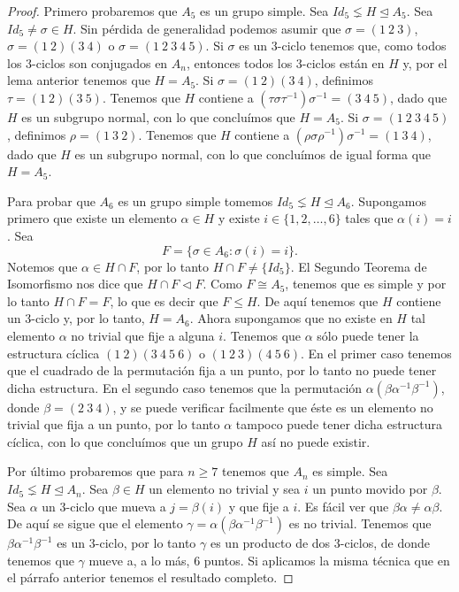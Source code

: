 \begin{proof}
    Primero probaremos que $A_5$ es un grupo simple. Sea $Id_{5}\lneq H\trianglelefteq A_5$. Sea $Id_{5}\neq \sigma \in H$. Sin p\'erdida de generalidad podemos asumir que $\sigma = (1\ 2\ 3)$, $\sigma = (1\ 2)(3\ 4)$ o $\sigma = (1\ 2\ 3\ 4\ 5)$. Si $\sigma$ es un $3$-ciclo tenemos que, como todos los $3$-ciclos son conjugados en $A_n$, entonces todos los $3$-ciclos est\'an en $H$ y, por el lema anterior tenemos que $H = A_5$. Si $\sigma = (1\ 2)(3\ 4)$, definimos $\tau = (1\ 2)(3\ 5)$. Tenemos que $H$ contiene a $(\tau\sigma\tau^{-1})\sigma^{-1} = (3\ 4\ 5)$, dado que $H$ es un subgrupo normal, con lo que conclu\'imos que $H = A_5$. Si $\sigma = (1\ 2\ 3\ 4\ 5)$, definimos $\rho = (1\ 3\ 2)$. Tenemos que $H$ contiene a $(\rho\sigma\rho^{-1})\sigma^{-1} = (1\ 3\ 4)$, dado que $H$ es un subgrupo normal, con lo que conclu\'imos de igual forma que $H = A_5$.

    Para probar que $A_6$ es un grupo simple tomemos $Id_{5}\lneq H\trianglelefteq A_6$. Supongamos primero que existe un elemento $\alpha\in H$ y existe $i\in \{1,2,\ldots, 6\}$ tales que $\alpha(i) = i$. Sea
    \[ F = \{\sigma\in A_6 : \sigma(i) = i\}.\]
    Notemos que $\alpha\in H\cap F$, por lo tanto $H\cap F\neq \{Id_{5}\}$. El Segundo Teorema de Isomorfismo nos dice que $H\cap F\vartriangleleft F$. Como $F\cong A_5$, tenemos que es simple y por lo tanto $H\cap F = F$, lo que es decir que $F\leq H$. De aqu\'i tenemos que $H$ contiene un $3$-ciclo y, por lo tanto, $H = A_6$. Ahora supongamos que no existe en $H$ tal elemento $\alpha$ no trivial que fije a alguna $i$. Tenemos que $\alpha$ s\'olo puede tener la estructura c\'iclica $(1\ 2)(3\ 4\ 5\ 6)$ o $(1\ 2\ 3)(4\ 5\ 6)$. En el primer caso tenemos que el cuadrado de la permutaci\'on fija a un punto, por lo tanto no puede tener dicha estructura. En el segundo caso tenemos que la permutación $\alpha(\beta\alpha^{-1}\beta^{-1})$, donde $\beta = (2\ 3\ 4)$, y se puede verificar facilmente que éste es un elemento no trivial que fija a un punto, por lo tanto $\alpha$ tampoco puede tener dicha estructura c\'iclica, con lo que conclu\'imos que un grupo $H$ as\'i no puede existir.

    Por \'ultimo probaremos que para $n\geq 7$ tenemos que $A_n$ es simple. Sea $Id_{5}\lneq H\trianglelefteq A_n$. Sea $\beta\in H$ un elemento no trivial y sea $i$ un punto movido por $\beta$. Sea $\alpha$ un $3$-ciclo que mueva a $j = \beta(i)$ y que fije a $i$. Es fácil ver que $\beta\alpha \neq \alpha\beta$. De aqu\'i se sigue que el elemento $\gamma = \alpha(\beta\alpha^{-1}\beta^{-1})$ es no trivial. Tenemos que $\beta\alpha^{-1}\beta^{-1}$ es un $3$-ciclo, por lo tanto $\gamma$ es un producto de dos $3$-ciclos, de donde tenemos que $\gamma$ mueve a, a lo m\'as, 6 puntos. Si aplicamos la misma t\'ecnica que en el p\'arrafo anterior tenemos el resultado completo.
\end{proof}

